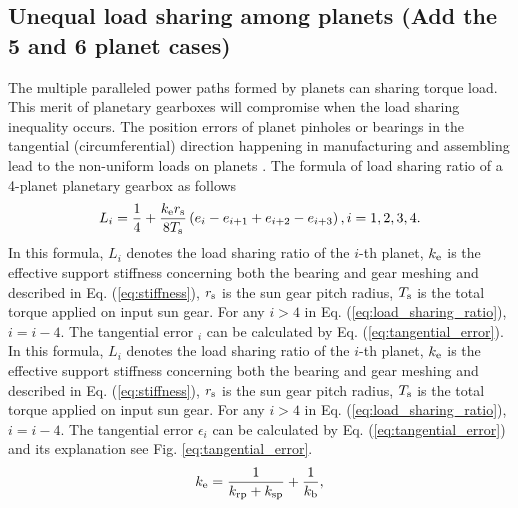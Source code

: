 \documentclass[a4paper,fleqn]{cas-sc}%
\begin{document}
\subsection{Unequal load sharing among planets (Add the 5 and 6 planet cases)}
\par The multiple paralleled power paths formed by planets can sharing torque load. This merit of planetary gearboxes will compromise when the load sharing inequality occurs. The position errors of planet pinholes or bearings in the tangential (circumferential) direction happening in manufacturing and assembling lead to the non-uniform loads on planets \cite{Singh2010511-530}. The formula of load sharing ratio of a 4-planet planetary gearbox as follows \cite{Ligata2009}
\begin{equation}
    L_i=\frac{1}{4}+\frac{k_{\rm e} r_{\rm s}}{8 T_{\rm s}}\left(e_i-e_{i+1}+e_{i+2}-e_{i+3}\right), i=1,2,3,4. \label{eq:load_sharing_ratio}
\end{equation}
In this formula, \(L_i\) denotes the load sharing ratio of the \(i\)-th planet, \(k_{\rm e}\) is the effective support stiffness concerning both the bearing and gear meshing and described in Eq. (\ref{eq:stiffness}), \(r_{\rm s}\) is the sun gear pitch radius, \(T_{\rm s}\) is the total torque applied on input sun gear. For any \(i>4\) in Eq. (\ref{eq:load_sharing_ratio}), \(i=i-4\). The tangential error $_{i}$ can be calculated by Eq. (\ref{eq:tangential_error}).
In this formula, \(L_i\) denotes the load sharing ratio of the \(i\)-th planet, \(k_{\rm e}\) is the effective support stiffness concerning both the bearing and gear meshing and described in Eq. (\ref{eq:stiffness}), \(r_{\rm s}\) is the sun gear pitch radius, \(T_{\rm s}\) is the total torque applied on input sun gear. For any \(i>4\) in Eq. (\ref{eq:load_sharing_ratio}), \(i=i-4\). The tangential error $\epsilon_{i}$ can be calculated by Eq. (\ref{eq:tangential_error}) and its explanation see Fig. \ref{eq:tangential_error}.
\begin{equation}
    k_{\rm e}=\frac{1}{k_{\rm rp}+k_{\rm sp}}+\frac{1}{k_{\rm b}},\label{eq:stiffness}
\end{equation}
\end{document}
